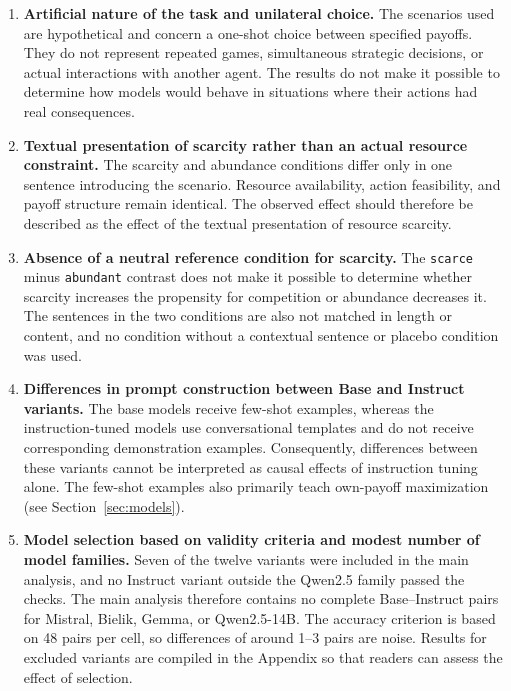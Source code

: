 \documentclass[11pt]{article}
\begin{document}
\begin{enumerate}[leftmargin=1.6em,itemsep=0.25em]

    \item \textbf{Artificial nature of the task and unilateral choice.}
    The scenarios used are hypothetical and concern a one-shot choice between specified payoffs. They do not represent repeated games, simultaneous strategic decisions, or actual interactions with another agent. The results do not make it possible to determine how models would behave in situations where their actions had real consequences.

    \item \textbf{Textual presentation of scarcity rather than an actual resource constraint.}
    The scarcity and abundance conditions differ only in one sentence introducing the scenario. Resource availability, action feasibility, and payoff structure remain identical. The observed effect should therefore be described as the effect of the textual presentation of resource scarcity.

    \item \textbf{Absence of a neutral reference condition for scarcity.}
    The \texttt{scarce} minus \texttt{abundant} contrast does not make it possible to determine whether scarcity increases the propensity for competition or abundance decreases it. The sentences in the two conditions are also not matched in length or content, and no condition without a contextual sentence or placebo condition was used.

    \item \textbf{Differences in prompt construction between Base and Instruct variants.}
    The base models receive few-shot examples, whereas the instruction-tuned models use conversational templates and do not receive corresponding demonstration examples. Consequently, differences between these variants cannot be interpreted as causal effects of instruction tuning alone. The few-shot examples also primarily teach own-payoff maximization (see Section~\ref{sec:models}).

    \item \textbf{Model selection based on validity criteria and modest number of model families.}
    Seven of the twelve variants were included in the main analysis, and no Instruct variant outside the Qwen2.5 family passed the checks. The main analysis therefore contains no complete Base--Instruct pairs for Mistral, Bielik, Gemma, or Qwen2.5-14B. The accuracy criterion is based on 48 pairs per cell, so differences of around 1--3 pairs are noise. Results for excluded variants are compiled in the Appendix so that readers can assess the effect of selection.


\end{enumerate}
\end{document}
